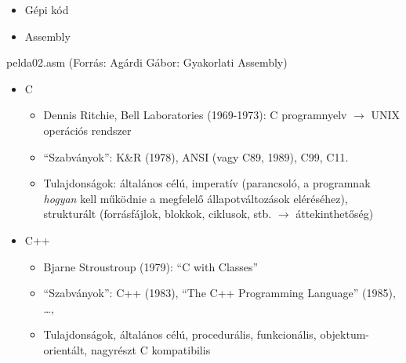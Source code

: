 \documentclass[usenames,dvipsnames,aspectratio=169]{beamer}
\begin{document}
\begin{frame}[fragile]
  \begin{itemize}
    \item Gépi kód
    \item Assembly
  \end{itemize}
  \begin{exampleblock}{pelda02.asm (Forrás: Agárdi Gábor: Gyakorlati Assembly)}
    \tiny
    
  \end{exampleblock}
\end{frame}

\begin{frame}
  \begin{itemize}
    \item C
    \begin{itemize}
      \item Dennis Ritchie, Bell Laboratories (1969-1973): C programnyelv $\rightarrow$ UNIX operációs rendszer
      \item ``Szabványok'': K\&R (1978), ANSI (vagy C89, 1989), C99, C11.
      \item Tulajdonságok: általános célú, imperatív (parancsoló, a programnak \emph{hogyan} kell működnie a megfelelő 
állapotváltozások eléréséhez), strukturált (forrásfájlok, blokkok, ciklusok, stb. $\rightarrow$ áttekinthetőség)   
    \end{itemize}
    \item C++
    \begin{itemize}
      \item Bjarne Stroustroup (1979): ``C with Classes''
      \item ``Szabványok'': C++ (1983), ``The C++ Programming Language'' (1985), \dots, 
      \item Tulajdonságok, általános célú, procedurális, funkcionális, objektum-orientált, nagyrészt C kompatibilis
    \end{itemize}
  \end{itemize}
\end{frame}
\end{document}
